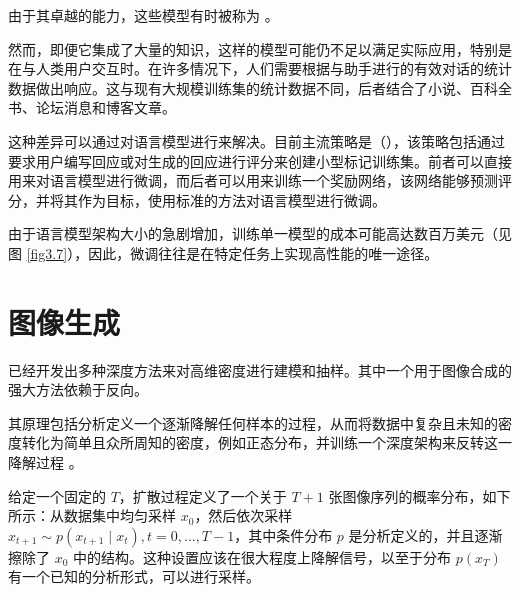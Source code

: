 由于其卓越的能力，这些模型有时被称为 \citep{arxiv-2108.07258}。

然而，即便它集成了大量的知识，这样的模型可能仍不足以满足实际应用，特别是在与人类用户交互时。在许多情况下，人们需要根据与助手进行的有效对话的统计数据做出响应。这与现有大规模训练集的统计数据不同，后者结合了小说、百科全书、论坛消息和博客文章。

这种差异可以通过对语言模型进行来解决。目前主流策略是（）\citep{arxiv-2203.02155}，该策略包括通过要求用户编写回应或对生成的回应进行评分来创建小型标记训练集。前者可以直接用来对语言模型进行微调，而后者可以用来训练一个奖励网络，该网络能够预测评分，并将其作为目标，使用标准的方法对语言模型进行微调。

由于语言模型架构大小的急剧增加，训练单一模型的成本可能高达数百万美元（见图 \ref{fig3.7}），因此，微调往往是在特定任务上实现高性能的唯一途径。

\section{图像生成}\label{sec7.2}

已经开发出多种深度方法来对高维密度进行建模和抽样。其中一个用于图像合成的强大方法依赖于反向。

其原理包括分析定义一个逐渐降解任何样本的过程，从而将数据中复杂且未知的密度转化为简单且众所周知的密度，例如正态分布，并训练一个深度架构来反转这一降解过程 \citep{arxiv-2006.11239}。

给定一个固定的 $T$，扩散过程定义了一个关于 $T + 1$ 张图像序列的概率分布，如下所示：从数据集中均匀采样 $x_0$，然后依次采样 $x_{t+1} \sim p(x_{t+1} \mid x_t), t = 0,\dots,T-1$，其中条件分布 $p$ 是分析定义的，并且逐渐擦除了 $x_0$ 中的结构。这种设置应该在很大程度上降解信号，以至于分布 $p(x_T )$ 有一个已知的分析形式，可以进行采样。

